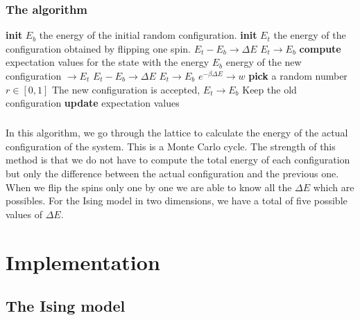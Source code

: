 \documentclass[a4paper, twoside, 11pt]{report}
\theoremstyle{theorem}
\theoremstyle{remark}
\theoremstyle{exemple}
\begin{document}
        \subsection{The algorithm}
        
            \begin{algorithmic}[1]
		       
                \State \textbf{init} $E_b$ the energy of the initial random configuration.
		\State \textbf{init} $E_t$ the energy of the configuration obtained by flipping one spin.
		\State $E_t - E_b \rightarrow \Delta E$
		\State $E_t \rightarrow E_b$
		\State \textbf{compute} expectation values for the state with the energy $E_b$
		        \State energy of the new configuration $\rightarrow E_t$
		        \State $E_t - E_b \rightarrow \Delta E$
		            \State $E_t \rightarrow E_b$
		        \Else
		            \State $e^{-\beta \Delta E} \rightarrow w$
		            \State \textbf{pick} a random number $r \in [0,1]$ 
		                \State The new configuration is accepted, $E_t \rightarrow E_b$
		            \Else 
		                \State Keep the old configuration
		            \EndIf
		        \EndIf
		        \State \textbf{update} expectation values 
		    \EndFor
		        
            \end{algorithmic}
            
            \paragraph{}In this algorithm, we go through the lattice to calculate the energy of the actual configuration of the system. This is a Monte Carlo cycle. The strength of this method is that we do not have to compute the total energy of each configuration but only the difference between the actual configuration and the previous one. When we flip the spins only one by one we are able to know all the $\Delta E$ which are possibles. For the Ising model in two dimensions, we have a total of five possible values of $\Delta E$.
		
	    
		


\chapter{Implementation}

    \section{The Ising model}
    
\end{document}
